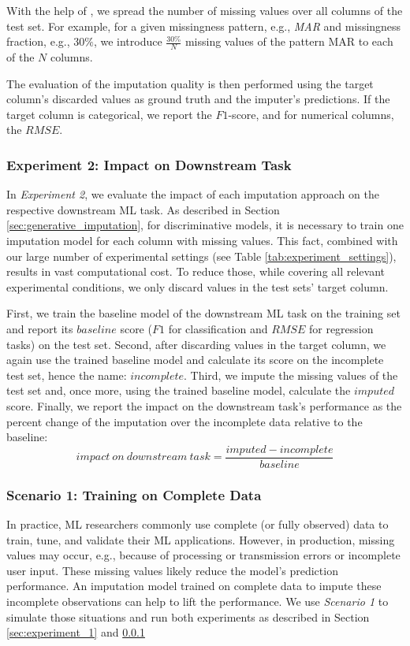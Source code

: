 With the help of , we spread the number of missing values over all columns of the test set. For example, for a given missingness pattern, e.g., \emph{MAR} and missingness fraction, e.g., $30\%$, we introduce $\frac{30\%}{N}$ missing values of the pattern MAR to each of the $N$ columns.

The evaluation of the imputation quality is then performed using the target column's discarded values as ground truth and the imputer's predictions. If the target column is categorical, we report the $F1$-score, and for numerical columns, the $RMSE$.


\subsubsection{Experiment 2: Impact on Downstream Task}
\label{sec:experiment_2}
%
In \emph{Experiment 2}, we evaluate the impact of each imputation approach on the respective downstream ML task. As described in Section \ref{sec:generative_imputation}, for discriminative models, it is necessary to train one imputation model for each column with missing values. This fact, combined with our large number of experimental settings (see Table \ref{tab:experiment_settings}), results in vast computational cost. To reduce those, while covering all relevant experimental conditions, we only discard values in the test sets’ target column.

First, we train the baseline model of the downstream ML task on the training set and report its $baseline$ score ($F1$ for classification and $RMSE$ for regression tasks) on the test set. Second, after discarding values in the target column, we again use the trained baseline model and calculate its score on the incomplete test set, hence the name: $incomplete$. Third, we impute the missing values of the test set and, once more, using the trained baseline model, calculate the $imputed$ score. Finally, we report the impact on the downstream task's performance as the percent change of the imputation over the incomplete data relative to the baseline:
%
\begin{equation}
	impact\ on \ downstream\ task = \frac{imputed - incomplete}{baseline}
	\label{eq:impact}
\end{equation}
%



\subsubsection{Scenario 1: Training on Complete Data}
\label{sec:scenario_1}
%
In practice, ML researchers commonly use complete (or fully observed) data to train, tune, and validate their ML applications. However, in production, missing values may occur, e.g., because of processing or transmission errors or incomplete user input. These missing values likely reduce the model's prediction performance. An imputation model trained on complete data to impute these incomplete observations can help to lift the performance. We use \emph{Scenario 1} to simulate those situations and run both experiments as described in Section \ref{sec:experiment_1} and \ref{sec:experiment_2}


